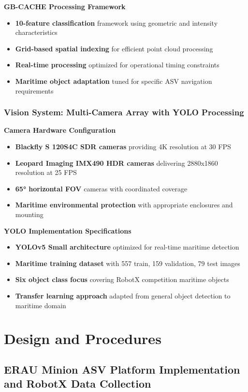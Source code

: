 \documentclass{erauthesis}
\begin{document}
\textbf{GB-CACHE Processing Framework}
\begin{itemize}
\item \textbf{10-feature classification} framework using geometric and intensity characteristics
\item \textbf{Grid-based spatial indexing} for efficient point cloud processing
\item \textbf{Real-time processing} optimized for operational timing constraints
\item \textbf{Maritime object adaptation} tuned for specific ASV navigation requirements
\end{itemize}

\subsubsection{Vision System: Multi-Camera Array with YOLO Processing}

\textbf{Camera Hardware Configuration}
\begin{itemize}
\item \textbf{Blackfly S 120S4C SDR cameras} providing 4K resolution at 30 FPS
\item \textbf{Leopard Imaging IMX490 HDR cameras} delivering 2880x1860 resolution at 25 FPS
\item \textbf{65° horizontal FOV} cameras with coordinated coverage
\item \textbf{Maritime environmental protection} with appropriate enclosures and mounting
\end{itemize}

\textbf{YOLO Implementation Specifications}
\begin{itemize}
\item \textbf{YOLOv5 Small architecture} optimized for real-time maritime detection
\item \textbf{Maritime training dataset} with 557 train, 159 validation, 79 test images
\item \textbf{Six object class focus} covering RobotX competition maritime objects
\item \textbf{Transfer learning approach} adapted from general object detection to maritime domain
\end{itemize}

\section{Design and Procedures}

\subsection{ERAU Minion ASV Platform Implementation and RobotX Data Collection}
\end{document}
